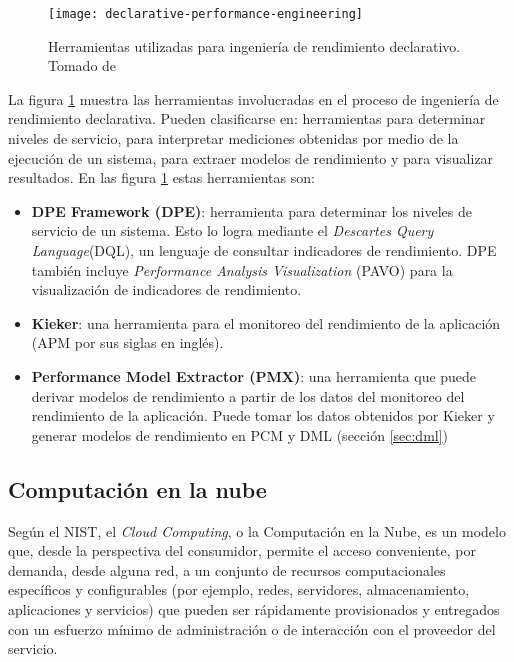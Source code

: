 \begin{figure}[h]
  \centering
  \texttt{[image: declarative-performance-engineering]}
  \caption[Herramientas utilizadas para ingeniería de rendimiento declarativo]{Herramientas utilizadas para ingeniería de rendimiento declarativo. Tomado de \cite{Walter:2018:TDP:3185768.3185777}}
  \label{fig:declarative-performance-engineering}
\end{figure}


La figura \ref{fig:declarative-performance-engineering} muestra las herramientas involucradas en el proceso de ingeniería de rendimiento declarativa. Pueden clasificarse en: herramientas para determinar niveles de servicio, para interpretar mediciones obtenidas por medio de la ejecución de un sistema, para extraer modelos de rendimiento y para visualizar resultados. En las figura \ref{fig:declarative-performance-engineering} estas herramientas son:
\begin{itemize}
    \item \textbf{DPE Framework (DPE)}: herramienta para determinar los niveles de servicio de un sistema. Esto lo logra mediante el \emph{Descartes Query Language}(DQL), un lenguaje de consultar indicadores de rendimiento. DPE también incluye \emph{Performance Analysis Visualization} (PAVO) para la visualización de indicadores de rendimiento.
    \item \textbf{Kieker}: una herramienta para el monitoreo del rendimiento de la aplicación (APM por sus siglas en inglés). 
    \item \textbf{Performance Model Extractor (PMX)}: una herramienta que puede derivar modelos de rendimiento a partir de los datos del monitoreo del rendimiento de la aplicación. Puede tomar los datos obtenidos por Kieker y generar modelos de rendimiento en PCM y DML (sección \ref{sec:dml})
\end{itemize}

 
\subsection{Computación en la nube}

Según el NIST\cite{Mell:2011:SND:2206223}, el \emph{Cloud Computing}, o la Computación en la Nube, es un modelo que, desde la perspectiva del consumidor, permite el acceso conveniente, por demanda, desde alguna red, a un conjunto de recursos computacionales específicos y configurables (por ejemplo, redes, servidores, almacenamiento, aplicaciones y servicios) que pueden ser rápidamente provisionados y entregados con un esfuerzo mínimo de administración o de interacción con el proveedor del servicio.

